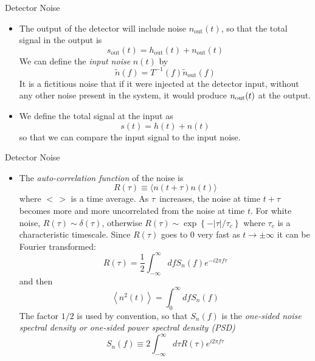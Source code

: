 \documentclass[size=11pt,style=paintings]{powerdot}
\begin{document}
  
  \begin{slide}{Detector Noise}
 \begin{itemize}
 \item The output of the detector will include noise $n_{\mathrm{out}}(t)$, so that the total signal in the output is 
$$
\boxed{s_{\mathrm{out}}(t)=h_{\mathrm{out}}(t)+n_{\mathrm{out}}(t)}
$$
We can define the \textit{input noise} $n(t)$  by $$
\boxed{\tilde{n}(f)=T^{-1}(f) \tilde{n}_{\mathrm{out}}(f)}
$$
It is a fictitious noise that if it were injected at the detector input, without any other noise present in the system, it would produce $n_{\rm out}(t)$ at the output.
\vskip 0.2cm
\item We define the total signal at the input as
$$
\boxed{s(t)=h(t)+n(t)}
$$
so that we can  compare the input signal to the input noise.
 \end{itemize}
 \end{slide}
 
  
  \begin{slide}{Detector Noise}
 \begin{itemize}
 \item The \textit{auto-correlation function} of the noise is 
 $$
\boxed{R(\tau) \equiv\langle n(t+\tau) n(t)\rangle}
$$
where $< \,>$ is a time average. As $\tau$\ increases, the noise at time $t+\tau$ becomes more and more uncorrelated from the noise at time $t$. For white noise, \(R(\tau) \sim \delta(\tau)\), otherwise $
R(\tau) \sim \exp \left\{-|\tau| / \tau_{c}\right\}
$ where $\tau_c$ is a characteristic timescale.
Since $R(\tau)$ goes to 0 very fast as $t\rightarrow \pm\infty$ it can be Fourier transformed:
\vskip -0.3cm
$$  R(\tau) =\frac{1}{2} \int_{-\infty}^{\infty} d f S_{n}(f) e^{-i 2 \pi f \tau} $$
 \vskip -0.3cm
and then
\vskip -0.6cm
$$
\boxed{\left\langle n^{2}(t)\right\rangle =\int_{0}^{\infty} d f S_{n}(f)}
$$The factor $1/2$ is used by convention, so that  $S_{n}(f)$ is the  \textit{one-sided noise spectral density or one-sided power spectral density (PSD)} 
 \vskip -0.3cm
$$ \boxed{S_{n}(f) \equiv 2 \int_{-\infty}^{\infty} d \tau R(\tau) e^{i 2 \pi f \tau}}$$
 \vskip -0.3cm
\end{itemize}
 \end{slide} 
 
\end{document}
